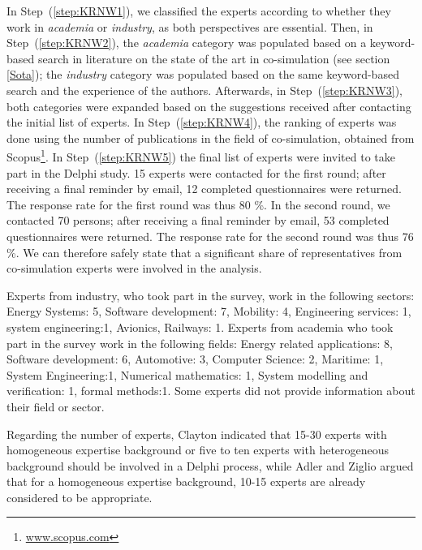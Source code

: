 \newcommand{\KRNW}[1]{Step~(\ref{step:KRNW#1})}

In \KRNW{1}, we classified the experts according to whether they work in \emph{academia} or \emph{industry}, as both perspectives are essential. 
Then, in \KRNW{2}, the \emph{academia} category was populated based on a keyword-based search in literature on the state of the art in co-simulation (see section \ref{Sota}); the \emph{industry} category was populated based on the same keyword-based search and the experience of the authors.
Afterwards, in \KRNW{3}, both categories were expanded  based on the suggestions received after contacting the initial list of experts.
In \KRNW{4}, the ranking of experts was done using the number of publications in the field of co-simulation, obtained from Scopus\trademark \footnote{\url{www.scopus.com}}.
In \KRNW{5} the final list of experts were invited to take part in the Delphi study. 
15 experts were contacted for the first round; after receiving a final reminder by email, 12 completed questionnaires were returned. The response rate for the first round was thus 80 \%.
In the second round, we contacted 70 persons; after receiving a final reminder by email, 53 completed questionnaires were returned. The response rate for the second round was thus 76 \%.
We can therefore safely state that a significant share of representatives from co-simulation experts were involved in the analysis.

Experts from industry, who took part in the survey, work in the following sectors: Energy Systems: 5, Software development: 7, Mobility: 4, Engineering services: 1, system engineering:1, Avionics, Railways: 1.
Experts from academia who took part in the survey work in the following fields: Energy related applications: 8, Software development: 6,  Automotive: 3, Computer Science: 2, Maritime: 1,  System Engineering:1, Numerical mathematics: 1, System modelling and verification: 1, formal methods:1.
Some experts did not provide information about their field or sector.

Regarding the number of experts, Clayton \cite{Clayton1997} indicated that 15-30 experts with homogeneous expertise background or five to ten experts with heterogeneous background should be involved in a Delphi process, while Adler and Ziglio \cite{Adler1996} argued that for a homogeneous expertise background, 10-15 experts are already considered to be appropriate. 

